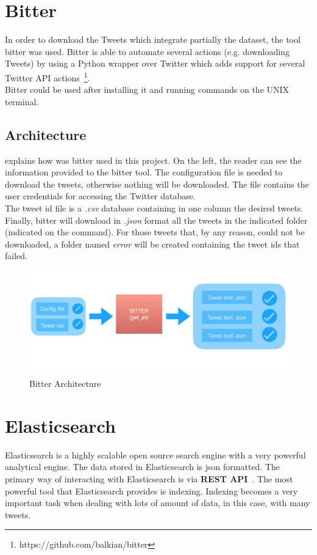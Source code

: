 \section{Bitter}
\label{sec:bitter}
In order to download the Tweets which integrate partially the dataset, the tool bitter was used. Bitter is able to automate several actions (e.g. downloading Tweets) by using a Python wrapper over Twitter which adds support for several Twitter API actions~\footnote{https://github.com/balkian/bitter}.\\
Bitter could be used after installing it and running commands on the UNIX terminal.
\subsection{Architecture}
 explains how was bitter used in this project. On the left, the reader can see the information provided to the bitter tool. The configuration file is needed to download the tweets, otherwise nothing will be downloaded. The file contains the user credentials for accessing the Twitter database.\\ The tweet id file is a \textit{.csv} database containing in one column the desired tweets. Finally, bitter will download in \textit{.json} format all the tweets in the indicated folder (indicated on the command). For those tweets that, by any reason, could not be downloaded, a folder named \textit{error} will be created containing the tweet ids that failed.
\begin{figure}
	\includegraphics[width=\linewidth]{img/bitter.png}
	\caption{Bitter Architecture}
	\label{fig:bitter}
\end{figure}
\section{Elasticsearch}
Elasticsearch is a highly scalable open source search engine with a very powerful analytical engine. The data stored in Elasticsearch is \ac{json} formatted. The primary way of interacting with Elasticsearch is via \textbf{REST API}~\cite{elastic1}. The most powerful tool that Elasticsearch provides is indexing. Indexing becomes a very important task when dealing with lots of amount of data, in this case, with many tweets.
